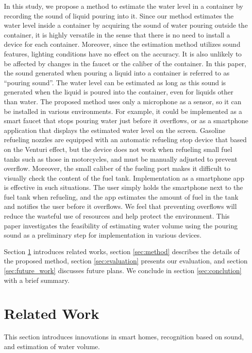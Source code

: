 \documentclass[sigconf]{acmart}
\begin{document}
In this study, we propose a method to estimate the water level in a container by recording the sound of liquid pouring into it. Since our method estimates the water level inside a container by acquiring the sound of water pouring outside the container, it is highly versatile in the sense that there is no need to install a device for each container. Moreover, since the estimation method utilizes sound features, lighting conditions have no effect on the accuracy. It is also unlikely to be affected by changes in the faucet or the caliber of the container. In this paper, the sound generated when pouring a liquid into a container is referred to as ``pouring sound''. The water level can be estimated as long as this sound is generated when the liquid is poured into the container, even for liquids other than water. The proposed method uses only a microphone as a sensor, so it can be installed in various environments. For example, it could be implemented as a smart faucet that stops pouring water just before it overflows, or as a smartphone application that displays the estimated water level on the screen. Gasoline refueling nozzles are equipped with an automatic refueling stop device that based on the Venturi effect, but the device does not work when refueling small fuel tanks such as those in motorcycles, and must be manually adjusted to prevent overflow. Moreover, the small caliber of the fueling port makes it difficult to visually check the content of the fuel tank. Implementation as a smartphone app is effective in such situations. The user simply holds the smartphone next to the fuel tank when refueling, and the app estimates the amount of fuel in the tank and notifies the user before it overflows. We feel that preventing overflows will reduce the wasteful use of resources and help protect the environment. This paper investigates the feasibility of estimating water volume using the pouring sound as a preliminary step for implementation in various devices.\par

Section \ref{sec:related} introduces related works, section \ref{sec:method} describes the details of the proposed method, section \ref{sec:evaluation} presents our evaluation, and section \ref{sec:future_work} discusses future plans. We conclude in section \ref{sec:conclution} with a brief summary.



\section{Related Work}
\label{sec:related}
This section introduces innovations in smart homes, recognition based on sound, and estimation of water volume.
\end{document}
